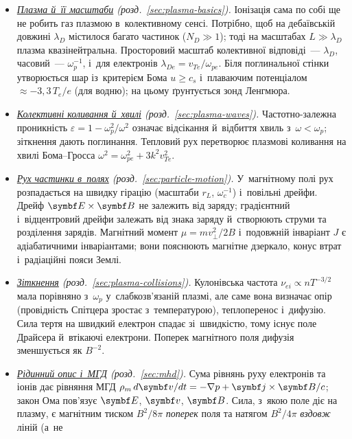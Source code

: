 \documentclass[biblatex]{ConspectBook}
\begin{document}
\begin{itemize}
	\item \emph{\hyperref[sec:plasma-basics]{Плазма й~її масштаби} (розд.~\ref{sec:plasma-basics}).} Іонізація сама по собі ще не робить газ плазмою
	  в~колективному сенсі. Потрібно, щоб на дебаївській довжині $\lambda_D$ містилося багато частинок
	  ($N_D\gg1$); тоді на масштабах $L\gg\lambda_D$ плазма квазінейтральна. Просторовий масштаб колективної відповіді~---
	  $\lambda_D$, часовий~--- $\omega_p^{-1}$, і~для електронів $\lambda_{De}=v_{Te}/\omega_{pe}$. Біля поглинальної стінки
	  утворюється шар із~критерієм Бома $u\ge c_s$ і~плаваючим потенціалом $\approx-3{,}3\,T_e/e$ (для водню); на цьому ґрунтується
	  зонд Ленгмюра.
	\item \emph{\hyperref[sec:plasma-waves]{Колективні коливання й~хвилі} (розд.~\ref{sec:plasma-waves}).} Частотно-залежна проникність $\varepsilon=1-\omega_p^2/\omega^2$ означає відсікання
	  й~відбиття хвиль з~$\omega<\omega_p$; зіткнення дають поглинання. Тепловий рух перетворює плазмові коливання на хвилі
	  Бома--Гросса $\omega^2=\omega_{pe}^2+3k^2v_{Te}^2$.
	\item \emph{\hyperref[sec:particle-motion]{Рух частинки в~полях} (розд.~\ref{sec:particle-motion}).} У~магнітному полі рух розпадається на швидку гірацію (масштаби $r_L$,
	  $\omega_c^{-1}$) і~повільні дрейфи. Дрейф $\vect E\times\vect B$ не залежить від заряду; градієнтний і~відцентровий дрейфи
	  залежать від знака заряду й~створюють струми та розділення зарядів. Магнітний момент $\mu=mv_\perp^2/2B$ і~подовжній
	  інваріант $J$ є адіабатичними інваріантами; вони пояснюють магнітне дзеркало, конус втрат і~радіаційні пояси Землі.
	\item \emph{\hyperref[sec:plasma-collisions]{Зіткнення} (розд.~\ref{sec:plasma-collisions}).} Кулонівська частота $\nu_{ei}\propto nT^{-3/2}$ мала порівняно з~$\omega_p$ у~слабкозв'язаній
	  плазмі, але саме вона визначає опір (провідність Спітцера зростає з~температурою), теплоперенос і~дифузію. Сила
	  тертя на швидкий електрон спадає зі~швидкістю, тому існує поле Драйсера й~втікаючі електрони. Поперек магнітного поля
	  дифузія зменшується як $B^{-2}$.
	\item \emph{\hyperref[sec:mhd]{Рідинний опис і~МГД} (розд.~\ref{sec:mhd}).} Сума рівнянь руху електронів та іонів дає рівняння МГД
	  $\rho_m\,d\vect v/dt=-\nabla p+\vect j\times\vect B/c$; закон Ома пов'язує $\vect E$, $\vect v$, $\vect B$. Сила, з~якою
	  поле діє на плазму, є магнітним тиском $B^2/8\pi$ \emph{поперек} поля та натягом $B^2/4\pi$ \emph{вздовж} ліній (а~не

\end{itemize}
\end{document}
